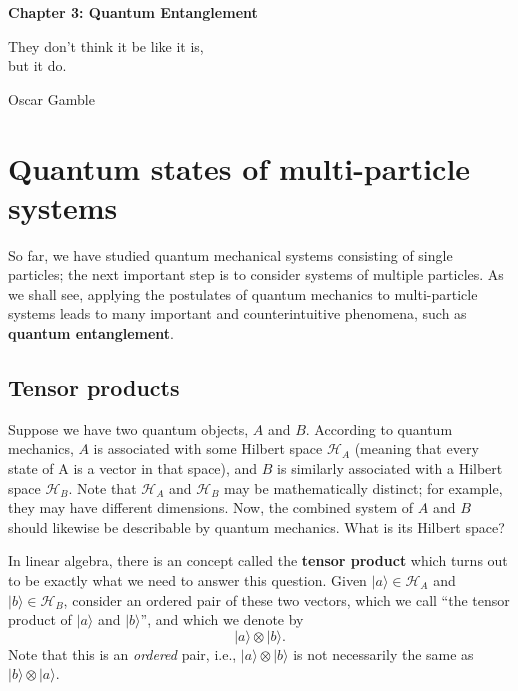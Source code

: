 \documentclass[pra,12pt]{revtex4-2}
\begin{document}
\setcounter{page}{36}

\begin{center}
{\Large \textbf{Chapter 3: Quantum Entanglement}}
\end{center}

\epigraph{They don't think it be like it is, \\but it do.}{Oscar Gamble}

\section{Quantum states of multi-particle systems}

So far, we have studied quantum mechanical systems consisting of
single particles; the next important step is to consider systems of
multiple particles.  As we shall see, applying the postulates of
quantum mechanics to multi-particle systems leads to many important
and counterintuitive phenomena, such as \textbf{quantum entanglement}.

\subsection{Tensor products}
\label{sec:tensorprod}

Suppose we have two quantum objects, $A$ and $B$.  According to
quantum mechanics, $A$ is associated with some Hilbert space
$\mathscr{H}_A$ (meaning that every state of A is a vector in that
space), and $B$ is similarly associated with a Hilbert space
$\mathscr{H}_B$.  Note that $\mathscr{H}_A$ and $\mathscr{H}_B$ may be
mathematically distinct; for example, they may have different
dimensions.  Now, the combined system of $A$ and $B$ should likewise
be describable by quantum mechanics.  What is its Hilbert space?

In linear algebra, there is an concept called the \textbf{tensor
  product} which turns out to be exactly what we need to answer this
question.  Given $|a\rangle \in \mathscr{H}_A$ and $|b\rangle \in
\mathscr{H}_B$, consider an ordered pair of these two vectors, which
we call ``the tensor product of $|a\rangle$ and $|b\rangle$'', and
which we denote by
\begin{equation*}
  |a\rangle \otimes |b\rangle.
\end{equation*}
Note that this is an \textit{ordered} pair, i.e.,
$|a\rangle\otimes|b\rangle$ is not necessarily the same as
$|b\rangle\otimes|a\rangle$.
\end{document}
